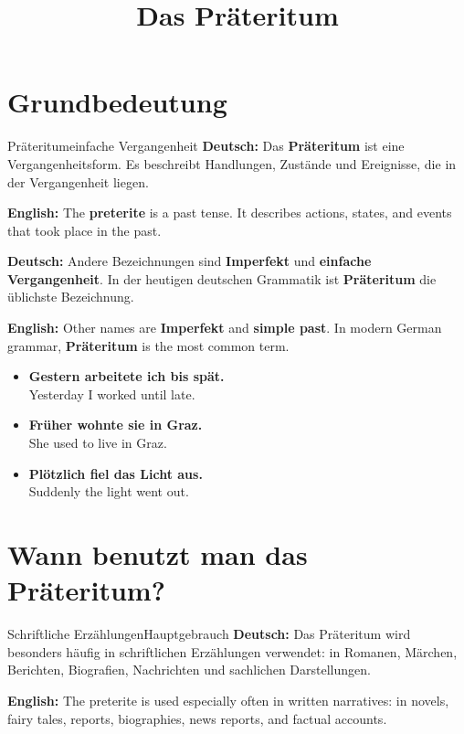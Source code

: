 \documentclass[a4paper,11pt]{article}
\title{Das Präteritum}
\date{}
\newcommand{\GermanText}[1]{\textbf{Deutsch: }#1\par}
\newcommand{\EnglishText}[1]{{\small\color{SoftGray}\textbf{English: }#1\par}}
\newcommand{\ExampleItem}[2]{\item \textbf{#1}\\{\small\color{SoftGray}#2}}
\begin{document}
    \maketitle
    \tableofcontents
    \newpage
    
    
    \section{Grundbedeutung}
        
        \begin{grammarentry}{Präteritum}{einfache Vergangenheit}
            \GermanText{Das \textbf{Präteritum} ist eine Vergangenheitsform. Es beschreibt Handlungen, Zustände und Ereignisse, die in der Vergangenheit liegen.}
            \EnglishText{The \textbf{preterite} is a past tense. It describes actions, states, and events that took place in the past.}
            
            \GermanText{Andere Bezeichnungen sind \textbf{Imperfekt} und \textbf{einfache Vergangenheit}. In der heutigen deutschen Grammatik ist \textbf{Präteritum} die üblichste Bezeichnung.}
            \EnglishText{Other names are \textbf{Imperfekt} and \textbf{simple past}. In modern German grammar, \textbf{Präteritum} is the most common term.}
        \end{grammarentry}
        
        \begin{exbox}
            \begin{itemize}
                \ExampleItem{Gestern arbeitete ich bis spät.}{Yesterday I worked until late.}
                \ExampleItem{Früher wohnte sie in Graz.}{She used to live in Graz.}
                \ExampleItem{Plötzlich fiel das Licht aus.}{Suddenly the light went out.}
            \end{itemize}
        \end{exbox}
    
    
    \section{Wann benutzt man das Präteritum?}
        
        \begin{grammarentry}{Schriftliche Erzählungen}{Hauptgebrauch}
            \GermanText{Das Präteritum wird besonders häufig in schriftlichen Erzählungen verwendet: in Romanen, Märchen, Berichten, Biografien, Nachrichten und sachlichen Darstellungen.}
            \EnglishText{The preterite is used especially often in written narratives: in novels, fairy tales, reports, biographies, news reports, and factual accounts.}
        \end{grammarentry}
        
\end{document}
